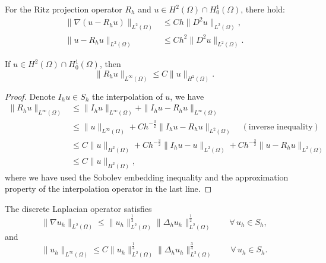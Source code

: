 \documentclass{siamart250211}
\begin{document}
\begin{lemma}
For the Ritz projection operator $R_h$ and $u \in H^2(\Omega) \cap H_0^1(\Omega)$, there hold:
\begin{align}
	 \|\nabla ( u - R_h u )\|_{L^2(\Omega)} &\le C h \|D^2u\|_{L^2(\Omega)}, \\
	 \|u - R_hu\|_{L^2(\Omega)} &\le Ch^2 \|D^2u\|_{L^2(\Omega)}. \label{equ: L2 convergence of Ritz projection}
\end{align}
\end{lemma}
\begin{lemma}\label{lem: L infty boundedness of R_h}
If $u \in H^2(\Omega) \cap H_0^1(\Omega)$, then 
	\begin{equation}
		\|R_h u\|_{L^{\infty}(\Omega)} \le C \|u\|_{H^2(\Omega)}.
	\end{equation}
\end{lemma}
\begin{proof}
	Denote $I_hu \in S_h$ the interpolation of $u$,  we have 
	\begin{align*}
		\|R_h u\|_{L^{\infty}(\Omega)} & \le \|I_hu\|_{L^{\infty}(\Omega)} + \|I_hu - R_h u\|_{L^{\infty}(\Omega)} \\
		& \le \|u\|_{L^{\infty}(\Omega)} + C h^{-\frac32}\|I_hu - R_h u\|_{L^{2}(\Omega)} \quad (\text{inverse inequality}) \\
		& \le C \|u\|_{H^{2}(\Omega)} + C h^{-\frac32}\|I_hu -  u\|_{L^{2}(\Omega)} + C h^{-\frac32}\|u - R_h u\|_{L^{2}(\Omega)} \\
		& \le C \|u\|_{H^2(\Omega)},
	\end{align*}
	where we have used the Sobolev embedding inequality and the approximation property of the interpolation operator \cite{brenner2008mathematical} in the last line.
\end{proof}
\begin{lemma}\label{lem: discrete Laplacian operator}
	The discrete Laplacian operator satisfies 
	\begin{equation}\label{equ: discrete interpolation}
		\|\nabla u_h \|_{L^2(\Omega)} \le \|u_h\|_{L^2(\Omega)}^{\frac12} \|\Delta_h u_h\|_{L^2(\Omega)}^{\frac12} \qquad \forall \, u_h \in S_h,
	\end{equation}
    and
    \begin{equation}\label{equ: discrete interpolation inequality}
		\|u_h \|_{L^{\infty}(\Omega)} \le C\|u_h\|_{L^2(\Omega)}^{\frac14} \|\Delta_h u_h\|_{L^2(\Omega)}^{\frac34} \qquad \forall \, u_h \in S_h.
	\end{equation}
\end{lemma}
\end{document}
